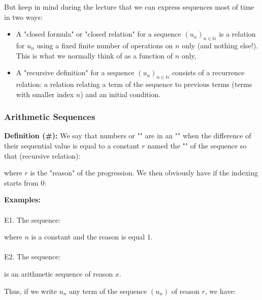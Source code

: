 	But keep in mind during the lecture that we can express sequences most of time in two ways:
	\begin{itemize}
		\item A "closed formula" or "closed relation" for a sequence $(u_n)_{n\in\mathbb{N}}$ is a relation for $u_n$ using a fixed finite number of operations on $n$ only (and nothing else!). This is what we normally think of as a function of $n$ only,
	
		\item A "recursive definition" for a sequence $(u_n)_{n\in\mathbb{N}}$ consists of a recurrence relation: a relation relating a term of the sequence to previous terms (terms with smaller index $n$) and an initial condition.
	\end{itemize}
	
	\pagebreak
\subsubsection{Arithmetic Sequences}

\textbf{Definition (\#\mydef):} We say that numbers or "" are in an "" when the difference of their sequential value is equal to a constant $r$ named the "" of the sequence so that (recursive relation):
	
where $r$ is the "reason" of the progression. We then obviously have if the indexing starts from $0$:
	
	\begin{tcolorbox}[colframe=black,colback=white,sharp corners]
\textbf{{\Large {}}Examples:}\\\\
E1. The sequence:
	
where $n$ is a constant and the reason is equal $1$.\\\\
E2. The sequence:
	
	is an arithmetic sequence of reason $x$.
	\end{tcolorbox}
	Thus, if we write $u_n$ any term of the sequence $(u_n)$ of reason $r$, we have:
	
